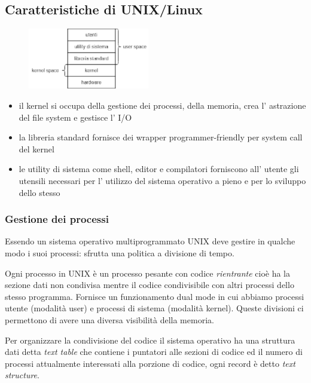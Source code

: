\subsection{Caratteristiche di UNIX/Linux}
\begin{figure}[H]
    \centering
    \includegraphics[width=200px]{images/13_UNIX_Linux/UNIX_stack.png}
\end{figure}
\begin{itemize}
    \item il kernel si occupa della gestione dei processi, della memoria, crea l' astrazione del file system e gestisce l' I/O
    \item la libreria standard fornisce dei wrapper programmer-friendly per system call del kernel
    \item le utility di sistema come shell, editor e compilatori forniscono all' utente gli utensili necessari per l' utilizzo del sistema operativo a pieno e per lo sviluppo dello stesso 
\end{itemize}

\subsubsection{Gestione dei processi}
Essendo un sistema operativo multiprogrammato UNIX deve gestire in qualche modo i suoi processi: sfrutta una politica a divisione di tempo.

Ogni processo in UNIX è un processo pesante con codice \emph{rientrante} cioè ha la sezione dati non condivisa mentre il codice condivisibile con altri processi dello stesso programma.
Fornisce un funzionamento dual mode in cui abbiamo processi utente (modalità user) e processi di sistema (modalità kernel).
Queste divisioni ci permettono di avere una diversa visibilità della memoria.

Per organizzare la condivisione del codice il sistema operativo ha una struttura dati detta \emph{text table} che contiene i puntatori alle sezioni di codice ed il numero di processi attualmente interessati alla porzione di codice, ogni record è detto \emph{text structure}.

